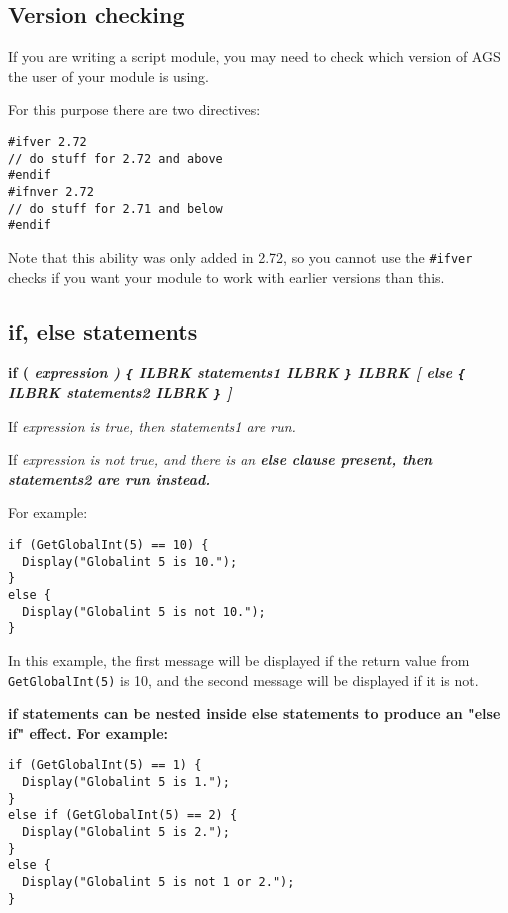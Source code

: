 \subsection{Version checking}\label{VersionChecks}%

If you are writing a script module, you may need to check which version of AGS the user
of your module is using.

For this purpose there are two directives:
\begin{verbatim}
#ifver 2.72
// do stuff for 2.72 and above
#endif
#ifnver 2.72
// do stuff for 2.71 and below
#endif
\end{verbatim}

Note that this ability was only added in 2.72, so you cannot use the \verb$#ifver$ checks
if you want your module to work with earlier versions than this.


\subsection{if, else statements}\label{ifelsestatements}%

\bf{if (} \it{expression} \bf{)}  \verb${$ ILBRK
  \it{statements1} ILBRK
\verb$}$ ILBRK
[ \bf{else}  \verb${$ ILBRK
  \it{statements2} ILBRK
\verb$}$ ]

If \it{expression} is true, then \it{statements1} are run.

If \it{expression} is not true, and there is an \bf{else} clause present, then
\it{statements2} are run instead.

For example:

\begin{verbatim}
if (GetGlobalInt(5) == 10) {
  Display("Globalint 5 is 10.");
}
else {
  Display("Globalint 5 is not 10.");
}
\end{verbatim}

In this example, the first message will be displayed if the return value from
\verb$GetGlobalInt(5)$ is 10, and the second message will be displayed if it is not.

\bf{if} statements can be nested inside \bf{else} statements to produce an "else if"
effect. For example:

\begin{verbatim}
if (GetGlobalInt(5) == 1) {
  Display("Globalint 5 is 1.");
}
else if (GetGlobalInt(5) == 2) {
  Display("Globalint 5 is 2.");
}
else {
  Display("Globalint 5 is not 1 or 2.");
}
\end{verbatim}


